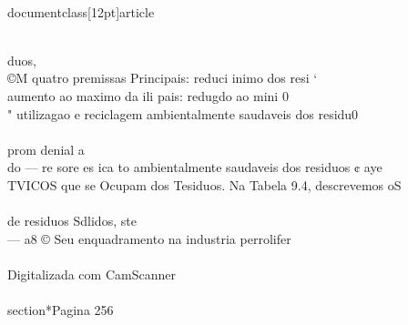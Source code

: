\\documentclass[12pt]{article}
\begin{document}
\\
duos,\\
©M quatro premissas Principais: reduci inimo dos resi ‘\\
aumento ao maximo da ili pais: redugdo ao mini 0\\
" utilizagao e reciclagem ambientalmente saudaveis dos residu0\\
\\
prom denial a\\
do — re sore es ica to ambientalmente saudaveis dos residuos ¢ aye\\
TVICOS que se Ocupam dos Tesiduos. Na Tabela 9.4, descrevemos oS\\
\\
de residuos Sdlidos, ste\\
— a8 © Seu enquadramento na industria perrolifer\\
\\
Digitalizada com CamScanner\\

\\section*{Pagina 256}
\end{document}

